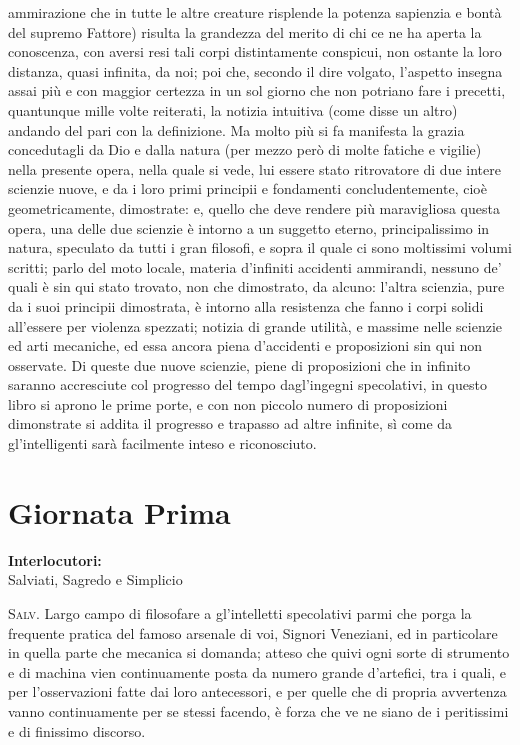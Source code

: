 \documentclass[11pt,twoside,openany]{book}
\newcommand{\speaker}[1]{\textcolor{rubric}{\textsc{#1}}\space}
\begin{document}
ammirazione che in tutte le altre creature risplende la potenza sapienzia e bontà del supremo Fattore) risulta la grandezza del merito di chi ce ne ha aperta la conoscenza, con aversi resi tali corpi distintamente conspicui, non ostante la loro distanza, quasi infinita, da noi; poi che, secondo il dire volgato, l'aspetto insegna assai più e con maggior certezza in un sol giorno che non potriano fare i precetti, quantunque mille volte reiterati, la notizia intuitiva (come disse un altro) andando del pari con la definizione. Ma molto più si fa manifesta la grazia concedutagli da Dio e dalla natura (per mezzo però di molte fatiche e vigilie) nella presente opera, nella quale si vede, lui essere stato ritrovatore di due intere scienzie nuove, e da i loro primi principii e fondamenti concludentemente, cioè geometricamente, dimostrate: e, quello che deve rendere più maravigliosa questa opera, una delle due scienzie è intorno a un suggetto eterno, principalissimo in natura, speculato da tutti i gran filosofi, e sopra il quale ci sono moltissimi volumi scritti; parlo del moto locale, materia d'infiniti accidenti ammirandi, nessuno de' quali è sin qui stato trovato, non che dimostrato, da alcuno: l'altra scienzia, pure da i suoi principii dimostrata, è intorno alla resistenza che fanno i corpi solidi all'essere per violenza spezzati; notizia di grande utilità, e massime nelle scienzie ed arti mecaniche, ed essa ancora piena d'accidenti e proposizioni sin qui non osservate. Di queste due nuove scienzie, piene di proposizioni che in infinito saranno accresciute col progresso del tempo dagl'ingegni specolativi, in questo libro si aprono le prime porte, e con non piccolo numero di proposizioni dimonstrate si addita il progresso e trapasso ad altre infinite, sì come da gl'intelligenti sarà facilmente inteso e riconosciuto.

\mainmatter

\chapter*{Giornata Prima}

\begin{center}
\textbf{Interlocutori:}\\ Salviati, Sagredo e Simplicio
\end{center}

\speaker{Salv.} Largo campo di filosofare a gl'intelletti specolativi parmi che porga la frequente pratica del famoso arsenale di voi, Signori Veneziani, ed in particolare in quella parte che mecanica si domanda; atteso che quivi ogni sorte di strumento e di machina vien continuamente posta da numero grande d'artefici, tra i quali, e per l'osservazioni fatte dai loro antecessori, e per quelle che di propria avvertenza vanno continuamente per se stessi facendo, è forza che ve ne siano de i peritissimi e di finissimo discorso.
\end{document}
